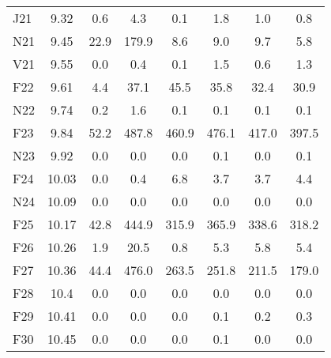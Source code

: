 \documentclass[article,crop=false]{standalone}%
\begin{document}
\begin{tabular}[h]{l c c c c c c c}
\rowcolor{white}%
J21&9.32&0.6&4.3&0.1&1.8&1.0&0.8\\%
\rowcolor{lightgray}%
N21&9.45&22.9&179.9&8.6&9.0&9.7&5.8\\%
\rowcolor{white}%
V21&9.55&0.0&0.4&0.1&1.5&0.6&1.3\\%
\rowcolor{lightgray}%
F22&9.61&4.4&37.1&45.5&35.8&32.4&30.9\\%
\rowcolor{white}%
N22&9.74&0.2&1.6&0.1&0.1&0.1&0.1\\%
\rowcolor{lightgray}%
F23&9.84&52.2&487.8&460.9&476.1&417.0&397.5\\%
\rowcolor{white}%
N23&9.92&0.0&0.0&0.0&0.1&0.0&0.1\\%
\rowcolor{lightgray}%
F24&10.03&0.0&0.4&6.8&3.7&3.7&4.4\\%
\rowcolor{white}%
N24&10.09&0.0&0.0&0.0&0.0&0.0&0.0\\%
\rowcolor{lightgray}%
F25&10.17&42.8&444.9&315.9&365.9&338.6&318.2\\%
\rowcolor{white}%
F26&10.26&1.9&20.5&0.8&5.3&5.8&5.4\\%
\rowcolor{lightgray}%
F27&10.36&44.4&476.0&263.5&251.8&211.5&179.0\\%
\rowcolor{white}%
F28&10.4&0.0&0.0&0.0&0.0&0.0&0.0\\%
\rowcolor{lightgray}%
F29&10.41&0.0&0.0&0.0&0.1&0.2&0.3\\%
\rowcolor{white}%
F30&10.45&0.0&0.0&0.0&0.1&0.0&0.0\\%
\hline%
\end{tabular}%
\end{document}
